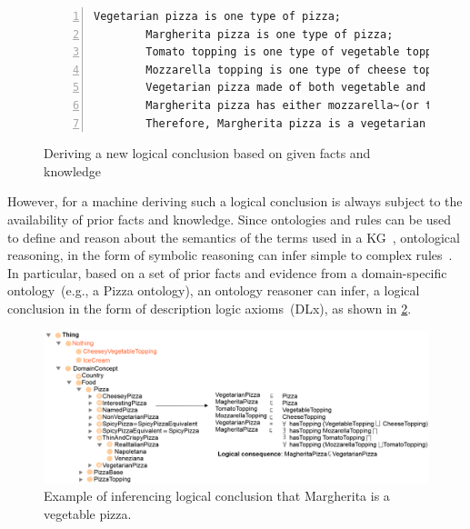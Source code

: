 
\begin{figure}[h]
    \centering
    \scriptsize
    \begin{Verbatim}[frame=single,numbers=left]
        Vegetarian pizza is one type of pizza; 
        Margherita pizza is one type of pizza;
        Tomato topping is one type of vegetable topping;
        Mozzarella topping is one type of cheese topping;
        Vegetarian pizza made of both vegetable and cheese topping;
        Margherita pizza has either mozzarella~(or tomato) topping or both;
        Therefore, Margherita pizza is a vegetarian pizza.
    \end{Verbatim}
    \vspace{-3mm}
    \caption{Deriving a new logical conclusion based on given facts and knowledge}
    \label{fig:sparqlEx11}
\end{figure}

\hspace*{3.5mm} However, for a machine deriving such a logical conclusion is always subject to the availability of prior facts and knowledge. Since ontologies and rules can be used to define and reason about the semantics of the terms used in a KG~\cite{hogan2020knowledge}, ontological reasoning, in the form of symbolic reasoning can infer simple to complex rules~\cite{futia2020integration}. In particular, based on a set of prior facts and evidence from a domain-specific ontology~(e.g., a Pizza ontology), an ontology reasoner can infer, a logical conclusion in the form of description logic axioms~(DLx), as shown in \cref{fig:pizza11}. %

\begin{figure}[h]
	\centering
	\includegraphics[scale=0.65]{images/pizza_onto.png}
	\caption{Example of inferencing logical conclusion that Margherita is a vegetable pizza.} 
	\label{fig:pizza11}
	\vspace{-2mm}
\end{figure}


